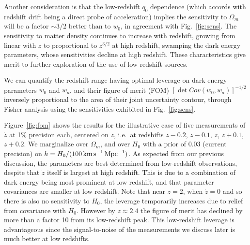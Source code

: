 \documentclass[preprint2, 10pt]{aastex}
\newcommand{\om}{\Omega_m}
\begin{document}
Another consideration is that the low-redshift $q_0$ dependence (which 
accords with redshift drift being a direct probe of acceleration) implies 
the sensitivity to $\om$ will be a factor $\sim3/2$ better than to $w_0$, 
in agreement with Fig.~\ref{fig:sens}. The sensitivity to matter density 
continues to increase with redshift, growing from linear with $z$ to 
proportional to $z^{3/2}$ at high redshift, swamping the dark energy 
parameters, whose sensitivities decline at high redshift. These 
characteristics give merit to further exploration of the use of 
low-redshift sources. 

We can quantify the redshift range having optimal leverage on dark energy 
parameters $w_0$ and $w_a$, and their figure of merit (FOM) 
$[\det Cov(w_0,w_a)]^{-1/2}$ inversely proportional to the area of their joint 
uncertainty contour, through Fisher analysis using the sensitivities 
exhibited in Fig.~\ref{fig:sens}. 

Figure~\ref{fig:fom} shows the results for the illustrative case of 
five measurements of $\dot z$ at 1\% precision each, centered on $z$, 
i.e.\ at redshifts $z-0.2$, $z-0.1$, $z$, $z+0.1$, $z+0.2$. We marginalize 
over $\om$, and over $H_0$ with a 
prior of $0.03$ (current precision) on 
$h=H_0/(100\,{\rm km\,s}^{-1}\,{\rm Mpc}^{-1})$. As expected from our previous discussion, 
the parameters are best determined from low-redshift observations, despite 
that $\dot z$ itself is largest at high redshift. This is due to a 
combination of dark energy being most prominent at low redshift, and 
that parameter covariances are smaller at low redshift. Note that near 
$z=2$, when $\dot z=0$ and so there is also no sensitivity to $H_0$, 
the leverage temporarily increases due to relief from covariance with 
$H_0$. However by $z\approx2.4$ the figure of merit has declined by more 
than a factor 10 from its low-redshift peak. This low-redshift leverage is 
advantageous since the signal-to-noise of the measurements we discuss later 
is much better at low redshifts. 
\end{document}
